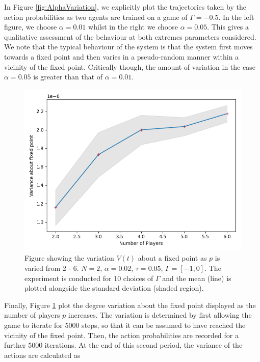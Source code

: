 \documentclass[sigconf,anonymous]{aamas}
\begin{document}
In Figure \ref{fig:AlphaVariation}, we explicitly plot the trajectories taken by the action probabilities as two agents are trained on a game of $\Gamma = -0.5$. In the left figure, we choose $\alpha = 0.01$ whilst in the right we choose $\alpha = 0.05$. This gives a qualitative assessment of the behaviour at both extremes parameters considered. We note that the typical behaviour of the system is that the system first moves towards a fixed point and then varies in a pseudo-random manner within a vicinity of the fixed point. Critically though, the amount of variation in the case $\alpha = 0.05$ is greater than that of $\alpha = 0.01$. 

\begin{figure}[t]
    \includegraphics[width = 0.95 \linewidth, center]{Figures/pVarianceExpt.png}
    \caption{Figure showing the variation $V(t)$ about a fixed point as $p$ is varied from 2 - 6. $N = 2$, $\alpha = 0.02$, $\tau = 0.05$, $\Gamma = [-1, 0]$. The experiment is conducted for 10 choices of $\Gamma$ and the mean (line) is plotted alongside the standard deviation (shaded region).}
    \label{fig:pVarianceExpt}
\end{figure}

Finally, Figure \ref{fig:pVarianceExpt} plot the degree variation about the fixed point displayed as the number of players $p$ increases. The variation is determined by first allowing the game to iterate for 5000 steps, so that it can be assumed to have reached the vicinity of the fixed point. Then, the action probabilities are recorded for a further 5000 iterations. At the end of this second period, the variance of the actions are calculated as
\end{document}
